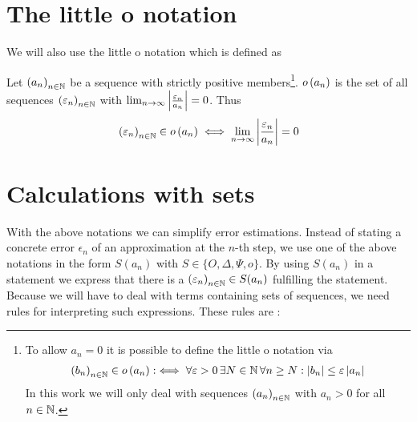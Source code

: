 \section{The little o notation}

We will also use the little o notation which is defined as~\cite[pp.~99,~103]{aigner}\cite[p.~385]{hachenberger}\cite{wiki:bigo}

\begin{definition}
  Let $\left({a_n}\right)_{{n}\in\mathbb N}$ be a sequence with strictly positive members\footnote{To allow $a_n=0$ it is possible to define the little o notation via~\cite[pp.~448]{graham}\cite{wiki:bigo}
  \begin{align}
    \left({b_n}\right)_{{n}\in\mathbb N}\in o\left( {a_n} \right) :\iff \forall \varepsilon > 0\, \exists N\in\mathbb N\, \forall n \ge N: \left|{b_n}\right| \le \varepsilon \left|{a_n}\right|
  \end{align}
   In this work we will only deal with sequences $\left({a_n}\right)_{{n}\in\mathbb N}$ with $a_n > 0$ for all $n\in\mathbb N$.
}. $o\left( {a_n} \right)$ is the set of all sequences $\left({\varepsilon_n}\right)_{{n}\in\mathbb N}$ with $\lim_{n\to\infty} \left|{\frac{\varepsilon_n}{a_n}}\right| = 0$. Thus
  \begin{align}
    \left({\varepsilon_n}\right)_{{n}\in\mathbb N}\in o\left( {a_n} \right) \iff \lim_{n\to\infty} \left|{\frac{\varepsilon_n}{a_n}}\right| = 0
  \end{align}
\end{definition}

\section{Calculations with sets} \label{sec:calculations_sets}

With the above notations we can simplify error estimations. Instead of stating a concrete error $\epsilon_n$ of an approximation at the $n$-th step, we use one of the above notations in the form $S(a_n)$ with $S\in\{O, \Delta, \Psi, o\}$. By using $S(a_n)$ in a statement we express that there is a $\left({\varepsilon_n}\right)_{{n}\in\mathbb N}\in S(a_n)$ fulfilling the statement. Because we will have to deal with terms containing sets of sequences, we need rules for interpreting such expressions. These rules are \cite{bigo_rules1}\cite[pp. 17-18]{kulla}:

